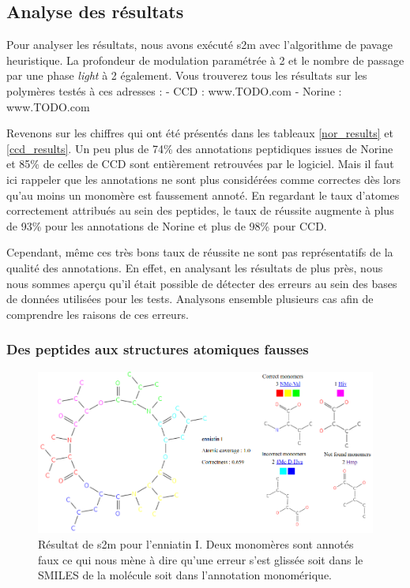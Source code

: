 \subsection{Analyse des résultats}
\label{res_analyse}

Pour analyser les résultats, nous avons exécuté s2m avec l'algorithme de pavage heuristique.
La profondeur de modulation paramétrée à 2 et le nombre de passage par une phase \textit{light} à 2 également.
Vous trouverez tous les résultats sur les polymères testés à ces adresses :
- CCD : www.TODO.com
- Norine : www.TODO.com


Revenons sur les chiffres qui ont été présentés dans les tableaux \ref{nor_results} et \ref{ccd_results}.
Un peu plus de 74\% des annotations peptidiques issues de Norine et 85\% de celles de CCD sont entièrement retrouvées par le logiciel.
Mais il faut ici rappeler que les annotations ne sont plus considérées comme correctes dès lors qu'au moins un monomère est faussement annoté.
En regardant le taux d'atomes correctement attribués au sein des peptides, le taux de réussite augmente à plus de 93\% pour les annotations de Norine et plus de 98\% pour CCD.

Cependant, même ces très bons taux de réussite ne sont pas représentatifs de la qualité des annotations.
En effet, en analysant les résultats de plus près, nous nous sommes aperçu qu'il était possible de détecter des erreurs au sein des bases de données utilisées pour les tests.
Analysons ensemble plusieurs cas afin de comprendre les raisons de ces erreurs.


\subsubsection{Des peptides aux structures atomiques fausses}

\begin{figure}[!ht]
  \begin{center}
    \includegraphics[width=450px]{Figures/s2m/results/s2m_enniati.png}
    \caption{\label{s2m_enniati}Résultat de s2m pour l'enniatin I.
    Deux monomères sont annotés faux ce qui nous mène à dire qu'une erreur s'est glissée soit dans le SMILES de la molécule soit dans l'annotation monomérique.}
  \end{center}
\end{figure}

